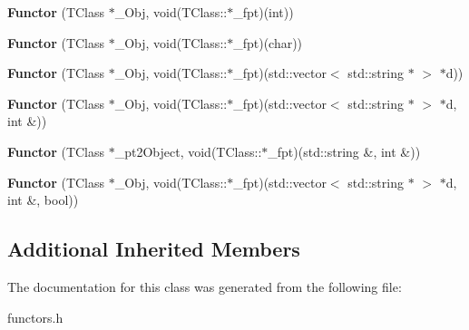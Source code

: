 \begin{DoxyCompactItemize}
\item 
{\bfseries Functor} (T\+Class $\ast$\+\_\+\+Obj, void(T\+Class\+::$\ast$\+\_\+fpt)(int))\hypertarget{classFunctor_a63413111cf1720fba9992253d336491f}{}\label{classFunctor_a63413111cf1720fba9992253d336491f}

\item 
{\bfseries Functor} (T\+Class $\ast$\+\_\+\+Obj, void(T\+Class\+::$\ast$\+\_\+fpt)(char))\hypertarget{classFunctor_a097ea2250bfbf1b15312028cb034902f}{}\label{classFunctor_a097ea2250bfbf1b15312028cb034902f}

\item 
{\bfseries Functor} (T\+Class $\ast$\+\_\+\+Obj, void(T\+Class\+::$\ast$\+\_\+fpt)(std\+::vector$<$ std\+::string $\ast$ $>$ $\ast$d))\hypertarget{classFunctor_a54d0c0448831b5c8b9f4668f29b57baa}{}\label{classFunctor_a54d0c0448831b5c8b9f4668f29b57baa}

\item 
{\bfseries Functor} (T\+Class $\ast$\+\_\+\+Obj, void(T\+Class\+::$\ast$\+\_\+fpt)(std\+::vector$<$ std\+::string $\ast$ $>$ $\ast$d, int \&))\hypertarget{classFunctor_aaa54c00db0212e6e115cd931151c93bd}{}\label{classFunctor_aaa54c00db0212e6e115cd931151c93bd}

\item 
{\bfseries Functor} (T\+Class $\ast$\+\_\+pt2\+Object, void(T\+Class\+::$\ast$\+\_\+fpt)(std\+::string \&, int \&))\hypertarget{classFunctor_a336ee3d31d395bbe2f0f5ee1364a6445}{}\label{classFunctor_a336ee3d31d395bbe2f0f5ee1364a6445}

\item 
{\bfseries Functor} (T\+Class $\ast$\+\_\+\+Obj, void(T\+Class\+::$\ast$\+\_\+fpt)(std\+::vector$<$ std\+::string $\ast$ $>$ $\ast$d, int \&, bool))\hypertarget{classFunctor_a02283c515b7d23e9293cb8287e5bb549}{}\label{classFunctor_a02283c515b7d23e9293cb8287e5bb549}

\end{DoxyCompactItemize}
\subsection*{Additional Inherited Members}


The documentation for this class was generated from the following file\+:\begin{DoxyCompactItemize}
\item 
functors.\+h\end{DoxyCompactItemize}
